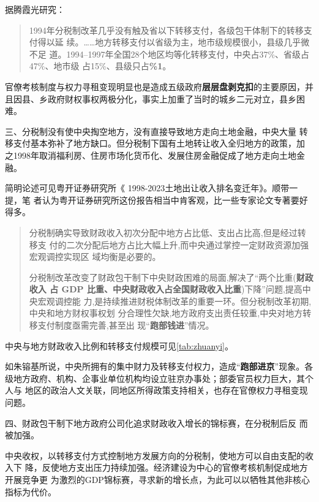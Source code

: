 据腾霞光研究：
\begin{quotation}
  1994年分税制改革几乎没有触及省以下转移支付，各级包干体制下的转移支付得以延
  续。……地方转移支付以省级为主，地市级规模很小，县级几乎微不足
  道。1994--1997年全国28个地区均等化转移支付，中央占37\%、省级占47\%、地市级
  占15\%、县级只占\textbf{\%1}。
\end{quotation}

官僚考核制度与权力寻租变现明显也是造成五级政府\textbf{层层盘剥克扣}的主要原因，并
且因县、乡政府财权事权两极分化，事实上加重了当时的城乡二元对立，县乡困难。


{\heiti 三、分税制没有使中央掏空地方，没有直接导致地方走向土地金融，中央大量
  转移支付基本弥补了地方缺口。但分税制下国有土地转让收入全归地方的政策，加
  之1998年取消福利房、住房市场化货币化、发展住房金融促成了地方走向土地金融。}

简明论述可见粤开证券研究所《 1998-2023土地出让收入排名变迁年》。顺带一提，笔
者认为粤开证券研究所这份报告相当中肯客观，比一些专家论文专著要好得多。
\begin{quotation}
  分税制确实导致财政收入初次分配中地方占比低、支出占比高,但是经过转移支
  付的二次分配后地方占比大幅上升,而中央通过掌控一定财政资源加强宏观调控实现区
  域均衡是必要的。

  分税制改革改变了财政包干制下中央财政困难的局面,解决了“两个比重(\textbf{财政收入
  占 GDP 比重、中央财政收入占全国财政收入比重})下降”问题,提高中央宏观调控能
  力,是持续推进财税体制改革的重要一环。但分税制改革初期,中央和地方财权事权划
  分合理性欠缺,地方政府支出责任较重,中央对地方转移支付制度亟需完善,甚至出
  现“\textbf{跑部钱进}”情况。
\end{quotation}

中央与地方财政收入比例和转移支付规模可见\cref{tab:zhuanyi}。

如朱镕基所说，中央所拥有的集中财力及转移支付权力，造成“\textbf{跑部进京}”现象。各
级地方政府、机构、企事业单位机构均设立驻京办事处；部委官员权力巨大，其个人与
地区的政治人文关联，同地区所得政策支持相关，也存在官僚权力寻租变现问题。

{\heiti 四、财政包干制下地方政府公司化追求财政收入增长的锦标赛，在分税制后反
  而被加强\cite{yangdi}。}

中央收权，以转移支付方式控制地方发展方向的分税制，使地方可以自由支配的收入下
降，反使地方支出压力持续加强。经济建设为中心的官僚考核机制促成地方开展竞争更
为激烈的GDP锦标赛，寻求新的增长点，为此可以以牺牲其他非核心指标为代价。

